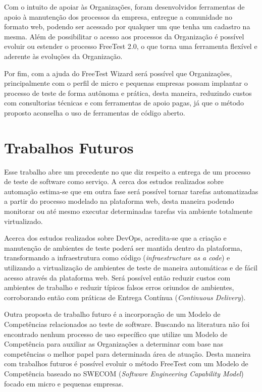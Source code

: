 Com o intuito de apoiar às Organizações, foram desenvolvidos ferramentas de apoio à manutenção dos processos da empresa, entregue a comunidade no formato web, podendo ser acessado por qualquer um que tenha um cadastro na mesma. Além de possibilitar o acesso aos processos da Organização é possível evoluir ou estender o processo FreeTest 2.0, o que torna uma ferramenta flexível e aderente às evoluções da Organização. 

Por fim, com a ajuda do FreeTest Wizard será possível que Organizações, principalmente com o perfil de micro e pequenas empresas possam implantar o processo de teste de forma autônoma e prática, desta maneira, reduzindo custos com consultorias técnicas e com ferramentas de apoio pagas, já que o método proposto aconselha o uso de ferramentas de código aberto.

\section{Trabalhos Futuros}
\label{sec:trabalhosfuturos}

Esse trabalho abre um precedente no que diz respeito a entrega de um processo de teste de software como serviço. A cerca dos estudos realizados sobre automação estima-se que em outra fase será possível tornar tarefas automatizadas a partir do processo modelado na plataforma web, desta maneira podendo monitorar ou até mesmo executar determinadas tarefas via ambiente totalmente virtualizado. 

Acerca dos estudos realizados sobre DevOps, acredita-se que a criação e manutenção de ambientes de teste poderá ser mantida dentro da plataforma, transformando a infraestrutura como código (\textit{infraestructure as a code}) e utilizando a virtualização de ambientes de teste de maneira automáticas e de fácil acesso através da plataforma web. Será possível então reduzir custos com ambientes de trabalho e reduzir típicos falsos erros oriundos de ambientes, corroborando então com práticas de Entrega Contínua (\textit{Continuous Delivery}). 

Outra proposta de trabalho futuro é a incorporação de um Modelo de Competências relacionados ao teste de software. Buscando na literatura não foi encontrado nenhum processo de uso específico que utilize um Modelo de Competência para auxiliar as Organizações a determinar com base nas competências o melhor papel para determinada área de atuação. Desta maneira com trabalhos futuros é possível evoluir o método FreeTest com um Modelo de Competência baseado no SWECOM (\textit{Software Engineering Capability Model}) \cite{swecom2017} focado em micro e pequenas empresas. 